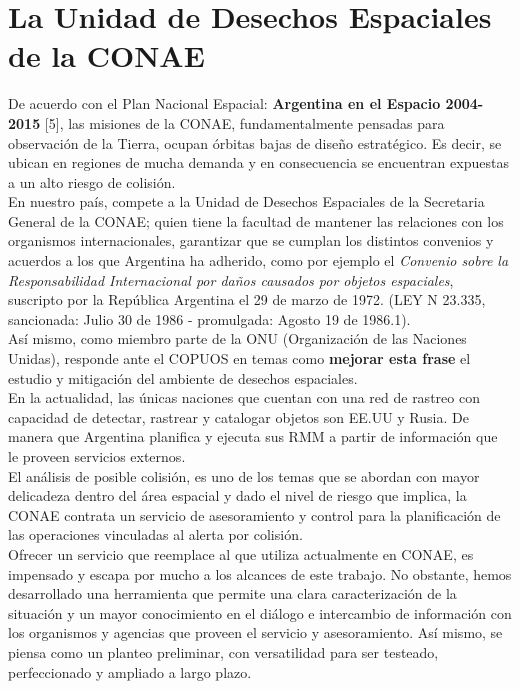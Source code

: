 {\section{La Unidad de Desechos Espaciales de la CONAE}
De acuerdo con el Plan Nacional Espacial: {\bf{ Argentina en el Espacio 2004-2015}} [5], las misiones de la CONAE, fundamentalmente pensadas para observaci\'on de la Tierra, ocupan \'orbitas bajas de dise\~no estrat\'egico. Es decir, se ubican en regiones de mucha demanda y en consecuencia se encuentran expuestas a un alto riesgo de colisi\'on.\\
En nuestro pa\'is, compete a la Unidad de Desechos Espaciales de la Secretaria General de la CONAE; quien tiene la facultad de mantener las relaciones con los organismos internacionales, garantizar que se cumplan los distintos convenios y acuerdos a los que Argentina ha adherido, como por ejemplo el {\it{Convenio sobre la Responsabilidad Internacional por da\~nos causados por objetos espaciales}}, suscripto por la Rep\'ublica Argentina el 29 de marzo de 1972. (LEY N 23.335, sancionada: Julio 30 de 1986 - promulgada: Agosto 19 de 1986.1).\\
 As\'i mismo, como miembro parte de la ONU (Organizaci\'on de las Naciones Unidas), responde ante el \ac{COPUOS} en temas como {\bf{mejorar esta frase}} el estudio y mitigaci\'on del ambiente de desechos espaciales.\\

En la actualidad, las \'unicas naciones que cuentan con una red de rastreo con capacidad de detectar, rastrear y catalogar objetos son EE.UU y Rusia. De manera que Argentina planifica y ejecuta sus RMM a partir de informaci\'on que le proveen servicios externos.\\

El an\'alisis de posible colisi\'on, es uno de los temas que se abordan con mayor delicadeza dentro del \'area espacial y dado el nivel de riesgo que implica, la CONAE contrata un servicio de asesoramiento y control para la planificaci\'on de las operaciones vinculadas al alerta por colisi\'on.\\
Ofrecer un servicio que reemplace al que utiliza actualmente en CONAE, es impensado y escapa por mucho a los alcances de este trabajo. No obstante, hemos desarrollado una herramienta que permite una clara caracterizaci\'on de la situaci\'on y un mayor conocimiento en el di\'alogo e intercambio de informaci\'on con los organismos y agencias que proveen el servicio y asesoramiento. As\'i mismo, se piensa como un planteo preliminar, con versatilidad para ser testeado, perfeccionado y ampliado a largo plazo.\\

}
